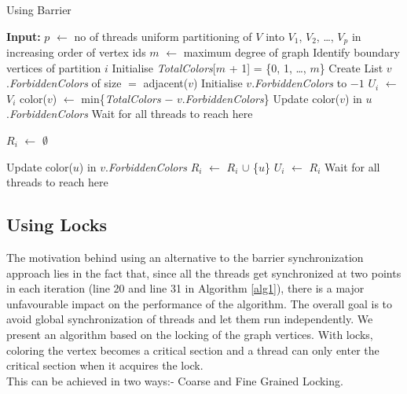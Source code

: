 \documentclass[a4paper,11pt]{article}
\begin{document}
\begin{algorithm}[H]


\caption{Using Barrier}
\label{alg1}
\begin{algorithmic}[1]

\State \textbf{Input:} $p$ $\leftarrow$ no of threads
\State uniform partitioning of $V$ into $V_1$, $V_2$, \dots, $V_p$ in increasing order of vertex ids
\State $m$ $\leftarrow$ maximum degree of graph
\State Identify boundary vertices of partition $i$
\State Initialise \textit{TotalColors}[$m$ + 1] = \{0, 1, \dots, $m$\}
\State Create List $v$.\textit{ForbiddenColors} of size $=$ adjacent($v$)
\State Initialise $v$.\textit{ForbiddenColors} to $-1$ 
\EndFor
\State $U_i$ $\leftarrow$ $V_i$
 
\State color($v$) $\leftarrow$ min\{\textit{TotalColors} $-$ $v$.\textit{ForbiddenColors}\}
\State Update color($v$) in $u$.\textit{ForbiddenColors}
\EndFor
\EndFor
\State Wait for all threads to reach here 
\end{algorithmic}
\end{algorithm}

\begin{algorithm}                     
\begin{algorithmic} [1]                   

\State $R_i$ $\leftarrow$ $\emptyset$ 

\State Update color($u$) in $v$.\textit{ForbiddenColors}
\State $R_i$ $\leftarrow$ $R_i$ $\cup$ \{$u$\}
\EndIf
\EndFor
\EndFor
\State $U_i$ $\leftarrow$ $R_i$
\State Wait for all threads to reach here 
\EndWhile
\EndFor
\EndProcedure
\end{algorithmic}


\end{algorithm}

\subsection{Using Locks}
The motivation behind using an alternative to the barrier synchronization approach lies in the fact that, since all the threads get synchronized at two points in each iteration (line 20 and line 31 in Algorithm \ref{alg1}), there is a major unfavourable impact on the performance of the algorithm. The overall goal is to avoid global synchronization of threads and let them run independently. We present an algorithm based on the locking of the graph vertices. With locks, coloring the vertex becomes a critical section and a thread can only enter the critical section when it acquires the lock.\\
This can be achieved in two ways:- Coarse and Fine Grained Locking. 
\end{document}
